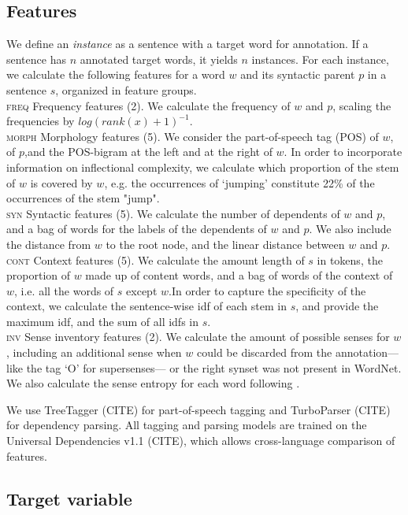 \documentclass[11pt,a4paper]{article}
\begin{document}
\subsection{Features}
We define an \textit{instance} as a sentence with a target word for annotation. If a sentence has $n$ annotated target words, it yields $n$ instances. For each instance, we calculate the following features for a word $w$ and its syntactic parent $p$ in a sentence $s$, organized in feature groups.\\ 
\noindent\textsc{freq} Frequency features (2). We calculate the frequency of $w$ and $p$, scaling the frequencies by $log(rank(x)+1)^{-1}$.\\
\textsc{morph} Morphology features (5). We consider the part-of-speech tag (POS) of $w$, of $p$,and the POS-bigram at the left and at the right of $w$. In order to incorporate information on inflectional complexity, we calculate which proportion of the stem of $w$ is covered by $w$, e.g. the occurrences of `jumping' constitute 22\% of the occurrences of the stem "jump". \\
\textsc{syn} Syntactic features (5). We calculate the number of dependents of $w$ and $p$, and a bag of words for the labels of the dependents of $w$ and $p$. We also include the distance from $w$ to the root node, and the linear distance between $w$ and $p$.\\
\textsc{cont} Context features (5). We calculate the amount length of $s$ in tokens, the proportion of $w$ made up of content words, and a bag of words of the context of $w$, i.e. all the words of $s$ except $w$.In order to capture the specificity of the context, we calculate the sentence-wise idf of each stem in $s$, and provide the maximum idf, and the sum of all idfs in $s$. \\
\textsc{inv} Sense inventory features (2). We calculate the amount of possible senses for $w$, including an additional sense when $w$ could be discarded from the annotation---like the tag `O' for supersenses--- or the right synset was not present in WordNet. We also calculate the sense entropy for each word following . 


We use TreeTagger (CITE) for part-of-speech tagging and TurboParser (CITE) for dependency parsing. All tagging and parsing models are trained on the Universal Dependencies v1.1 (CITE), which allows cross-language comparison of features.

\subsection{Target variable}
\end{document}
